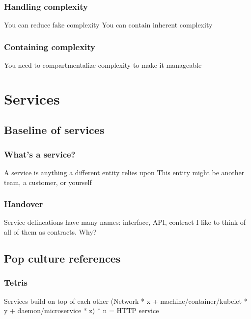 \documentclass[aspectratio=169]{beamer}
\begin{document}
\begin{frame}
	\frametitle{Handling complexity}
	\begin{center}
		\vfill
		You can reduce fake complexity
		\vfill
		You can contain inherent complexity
		\vfill
	\end{center}
\end{frame}

\begin{frame}
	\frametitle{Containing complexity}
	\begin{center}
		\vfill
		You need to compartmentalize complexity to make it manageable
		\vfill
	\end{center}
\end{frame}



\section{Services}


\subsection{Baseline of services}

\begin{frame}
	\frametitle{What's a service?}
	\begin{center}
		\vfill
		A service is anything a different entity relies upon
		\vfill
		This entity might be another team, a customer, or yourself
		\vfill
	\end{center}
\end{frame}

\begin{frame}
	\frametitle{Handover}
	\begin{center}
		\vfill
		Service delineations have many names: interface, API, contract
		\vfill
		I like to think of all of them as contracts. Why?
		\vfill
	\end{center}
\end{frame}


\subsection{Pop culture references}

\begin{frame}
	\frametitle{Tetris}
	\begin{center}
		\vfill
		Services build on top of each other
		\vfill
		(Network * x + machine/container/kubelet * y + daemon/microservice * z) * n = HTTP service
		\vfill
	\end{center}
\end{frame}
\end{document}
